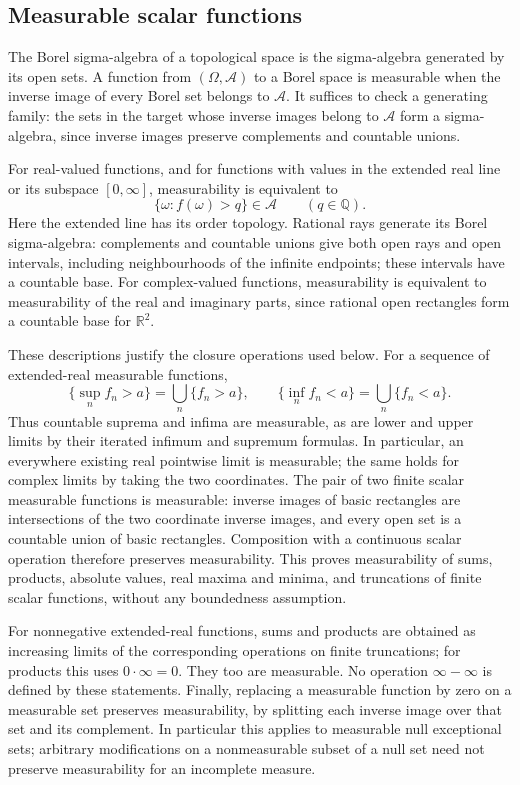 \subsection{Measurable scalar functions}
The Borel sigma-algebra of a topological space is the sigma-algebra
generated by its open sets. A function from $(\Omega,\mathcal A)$ to
a Borel space is measurable when the inverse image of every Borel set
belongs to $\mathcal A$. It suffices to check a generating family:
the sets in the target whose inverse images belong to $\mathcal A$
form a sigma-algebra, since inverse images preserve complements and
countable unions.

For real-valued functions, and for functions with values in the extended
real line or its subspace $[0,\infty]$, measurability is equivalent to
\[
\{\omega:f(\omega)>q\}\in\mathcal A\qquad(q\in\mathbb Q).
\]
Here the extended line has its order topology. Rational rays generate
its Borel sigma-algebra: complements and countable unions give both
open rays and open intervals, including neighbourhoods of the infinite
endpoints; these intervals have a countable base. For complex-valued
functions, measurability is equivalent to measurability of the real
and imaginary parts, since rational open rectangles form a countable
base for $\mathbb R^2$.

These descriptions justify the closure operations used below. For a
sequence of extended-real measurable functions,
\[
\{\sup_n f_n>a\}=\bigcup_n\{f_n>a\},\qquad
\{\inf_n f_n<a\}=\bigcup_n\{f_n<a\}.
\]
Thus countable suprema and infima are measurable, as are lower and
upper limits by their iterated infimum and supremum formulas. In
particular, an everywhere existing real pointwise limit is measurable;
the same holds for complex limits by taking the two coordinates.
The pair of two finite scalar measurable functions is measurable:
inverse images of basic rectangles are intersections of the two
coordinate inverse images, and every open set is a countable union
of basic rectangles. Composition with a continuous scalar operation
therefore preserves measurability. This proves measurability of sums,
products, absolute values, real maxima and minima, and truncations
of finite scalar functions, without any boundedness assumption.

For nonnegative extended-real functions, sums and products are obtained
as increasing limits of the corresponding operations on finite
truncations; for products this uses $0\cdot\infty=0$. They too are
measurable. No operation $\infty-\infty$ is defined by these statements.
Finally, replacing a measurable function by zero on a measurable set
preserves measurability, by splitting each inverse image over that set
and its complement. In particular this applies to measurable null
exceptional sets; arbitrary modifications on a nonmeasurable subset
of a null set need not preserve measurability for an incomplete measure.

